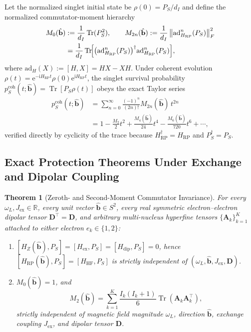 \documentclass[twocolumn,10pt,amsmath,amssymb,floatfix]{revtex4-2}
\theoremstyle{plain}
\newtheorem{theorem}{Theorem}
\theoremstyle{definition}
\newcommand{\ii}{\mathrm{i}}
\newcommand{\ee}{\mathrm{e}}
\newcommand{\Tr}{\operatorname{Tr}}
\newcommand{\normF}[1]{\left\lVert #1 \right\rVert_F}
\newcommand{\PS}{P_S}
\newcommand{\HRP}{H_{\mathrm{RP}}}
\newcommand{\HZ}{H_Z}
\newcommand{\HHF}{H_{\mathrm{HF}}}
\newcommand{\Hex}{H_{\mathrm{ex}}}
\newcommand{\Hdip}{H_{\mathrm{dip}}}
\begin{document}
Let the normalized singlet initial state be $\rho(0) = \PS / d_I$ and define the normalized commutator-moment hierarchy
\begin{align}
\label{eq:Mn_def}
M_0(\hat{\mathbf{b}}) &:= \frac{1}{d_I}\Tr(\PS^2), \qquad
M_{2n}(\hat{\mathbf{b}}) := \frac{1}{d_I}\normF{\mathrm{ad}_{\HRP}^n(\PS)}^2 \nonumber\\
&= \frac{1}{d_I}\Tr\!\Bigl[\bigl(\mathrm{ad}_{\HRP}^n(\PS)\bigr)^\dagger \mathrm{ad}_{\HRP}^n(\PS)\Bigr],
\end{align}
where $\mathrm{ad}_H(X) := [H,X] = HX - XH$. Under coherent evolution $\rho(t) = \ee^{-\ii \HRP t}\rho(0)\ee^{\ii \HRP t}$, the singlet survival probability $p_S^{\mathrm{coh}}(t;\hat{\mathbf{b}}) = \Tr[\PS \rho(t)]$ obeys the exact Taylor series
\begin{align}
\label{eq:pS_taylor}
p_S^{\mathrm{coh}}(t;\hat{\mathbf{b}}) &= \sum_{n=0}^{\infty} \frac{(-1)^n}{(2n)!} M_{2n}(\hat{\mathbf{b}})\, t^{2n} \nonumber\\
&= 1 - \frac{M_2}{2} t^2 + \frac{M_4(\hat{\mathbf{b}})}{24} t^4 - \frac{M_6(\hat{\mathbf{b}})}{720} t^6 + \cdots,
\end{align}
verified directly by cyclicity of the trace because $\HRP^\dagger = \HRP$ and $\PS^\dagger = \PS$.

\subsection{Exact Protection Theorems Under Exchange and Dipolar Coupling}

\begin{theorem}[Zeroth- and Second-Moment Commutator Invariance]
\label{thm:M0M2}
For every $\omega_L, J_{\mathrm{ex}} \in \mathbb{R}$, every unit vector $\hat{\mathbf{b}} \in S^2$, every real symmetric electron--electron dipolar tensor $\mathbf{D}^\top = \mathbf{D}$, and arbitrary multi-nucleus hyperfine tensors $\{\mathbf{A}_k\}_{k=1}^K$ attached to either electron $e_k \in \{1,2\}$:
\begin{enumerate}[label=(\alph*),leftmargin=1.5em,itemsep=1pt]
\item $[\HZ(\hat{\mathbf{b}}),\PS] = [\Hex,\PS] = [\Hdip,\PS] = 0$, hence $[\HRP(\hat{\mathbf{b}}),\PS] = [\HHF,\PS]$ is strictly independent of $(\omega_L,\hat{\mathbf{b}},J_{\mathrm{ex}},\mathbf{D})$.
\item $M_0(\hat{\mathbf{b}}) = 1$, and
\begin{equation}
\label{eq:M2_exact}
M_2(\hat{\mathbf{b}}) = \sum_{k=1}^K \frac{I_k(I_k+1)}{6}\Tr(\mathbf{A}_k \mathbf{A}_k^\top),
\end{equation}
strictly independent of magnetic field magnitude $\omega_L$, direction $\hat{\mathbf{b}}$, exchange coupling $J_{\mathrm{ex}}$, and dipolar tensor $\mathbf{D}$.
\end{enumerate}
\end{theorem}
\end{document}
